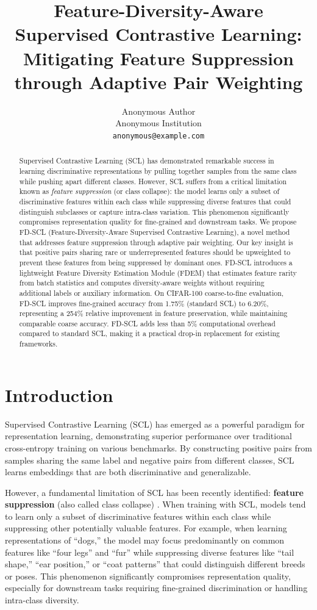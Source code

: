 \documentclass[11pt,a4paper]{article}
\title{Feature-Diversity-Aware Supervised Contrastive Learning: \\ Mitigating Feature Suppression through Adaptive Pair Weighting}
\author{Anonymous Author\\
Anonymous Institution\\
\texttt{anonymous@example.com}}
\begin{document}
\maketitle

\begin{abstract}
Supervised Contrastive Learning (SCL) has demonstrated remarkable success in learning discriminative representations by pulling together samples from the same class while pushing apart different classes. However, SCL suffers from a critical limitation known as \emph{feature suppression} (or class collapse): the model learns only a subset of discriminative features within each class while suppressing diverse features that could distinguish subclasses or capture intra-class variation. This phenomenon significantly compromises representation quality for fine-grained and downstream tasks. We propose FD-SCL (Feature-Diversity-Aware Supervised Contrastive Learning), a novel method that addresses feature suppression through adaptive pair weighting. Our key insight is that positive pairs sharing rare or underrepresented features should be upweighted to prevent these features from being suppressed by dominant ones. FD-SCL introduces a lightweight Feature Diversity Estimation Module (FDEM) that estimates feature rarity from batch statistics and computes diversity-aware weights without requiring additional labels or auxiliary information. On CIFAR-100 coarse-to-fine evaluation, FD-SCL improves fine-grained accuracy from 1.75\% (standard SCL) to 6.20\%, representing a 254\% relative improvement in feature preservation, while maintaining comparable coarse accuracy. FD-SCL adds less than 5\% computational overhead compared to standard SCL, making it a practical drop-in replacement for existing frameworks.
\end{abstract}

\section{Introduction}

Supervised Contrastive Learning (SCL) \citep{khosla2020supervised} has emerged as a powerful paradigm for representation learning, demonstrating superior performance over traditional cross-entropy training on various benchmarks. By constructing positive pairs from samples sharing the same label and negative pairs from different classes, SCL learns embeddings that are both discriminative and generalizable.

However, a fundamental limitation of SCL has been recently identified: \textbf{feature suppression} (also called class collapse) \citep{xue2023which, zhang2024learning}. When training with SCL, models tend to learn only a subset of discriminative features within each class while suppressing other potentially valuable features. For example, when learning representations of ``dogs,'' the model may focus predominantly on common features like ``four legs'' and ``fur'' while suppressing diverse features like ``tail shape,'' ``ear position,'' or ``coat patterns'' that could distinguish different breeds or poses. This phenomenon significantly compromises representation quality, especially for downstream tasks requiring fine-grained discrimination or handling intra-class diversity.
\end{document}
